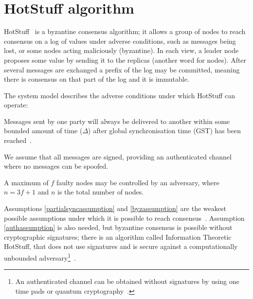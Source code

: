 \section{HotStuff algorithm} \label{hotstufftheory}
HotStuff~\cite{yinHotStuffBFTConsensus2019} is a byzantine consensus algorithm; it allows a group of nodes to reach consensus on a log of values under adverse conditions, such as messages being lost, or some nodes acting maliciously (byzantine). In each view, a leader node proposes some value by sending it to the replicas (another word for nodes). After several messages are exchanged a prefix of the log may be committed, meaning there is consensus on that part of the log and it is immutable.

The system model describes the adverse conditions under which HotStuff can operate:
\begin{assumption} \label{partialsyncassumption}
	Messages sent by one party will always be delivered to another within some bounded amount of time ($\Delta$) after global synchronisation time (GST) has been reached~\cite{dworkConsensusPresencePartial1988}.
\end{assumption}

\begin{assumption}[Authenticated] \label{authassumption}
	We assume that all messages are signed, providing an authenticated channel where no messages can be spoofed.
\end{assumption}

\begin{assumption}[Byzantine] \label{byzassumption}
	A maximum of $f$ faulty nodes may be controlled by an adversary, where $n = 3f + 1$ and $n$ is the total number of nodes.
\end{assumption}

Assumptions \ref{partialsyncassumption} and \ref{byzassumption} are the weakest possible assumptions under which it is possible to reach consensus~\cite{peaseReachingAgreementPresence1980,fischerEasyImpossibilityProofs1986}. Assumption \ref{authassumption} is also needed, but byzantine consensus is possible without cryptographic signatures; there is an algorithm called Information Theoretic HotStuff, that does not use signatures and is secure against a computationally unbounded adversary\footnote{An authenticated channel can be obtained without signatures by using one time pads or quantum cryptography~\cite{bennettExperimentalQuantumCryptography1992}.}~\cite{abrahamInformationTheoreticHotStuff2020}.

